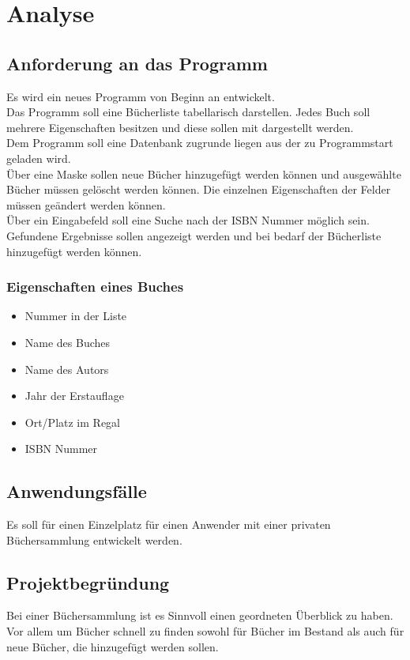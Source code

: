 
\section{Analyse}

\subsection{Anforderung an das Programm}
Es wird ein neues Programm von Beginn an entwickelt.\\
Das Programm soll eine Bücherliste tabellarisch darstellen.
Jedes Buch soll mehrere Eigenschaften besitzen und diese sollen mit dargestellt werden.
\\
Dem Programm soll eine Datenbank zugrunde liegen aus der zu Programmstart geladen wird.\\
Über eine Maske sollen neue Bücher hinzugefügt werden können und ausgewählte Bücher müssen gelöscht werden können. Die einzelnen Eigenschaften der Felder müssen geändert werden können.
\\ 
Über ein Eingabefeld soll eine Suche nach der ISBN Nummer möglich sein.\\
Gefundene Ergebnisse sollen angezeigt werden und bei bedarf der Bücherliste hinzugefügt werden können.\\

\subsubsection{Eigenschaften eines Buches}

\begin{itemize}
\item{Nummer in der Liste}
\item{Name des Buches}
\item{Name des Autors}
\item{Jahr der Erstauflage}
\item{Ort/Platz im Regal}
\item{ISBN Nummer}
\end{itemize}

\subsection{Anwendungsfälle}
Es soll für einen Einzelplatz für einen Anwender mit einer privaten Büchersammlung entwickelt werden.

\subsection{Projektbegründung}
Bei einer Büchersammlung ist es Sinnvoll einen geordneten Überblick zu haben.
Vor allem um Bücher schnell zu finden sowohl für Bücher im Bestand als auch für neue Bücher, die hinzugefügt werden sollen.

